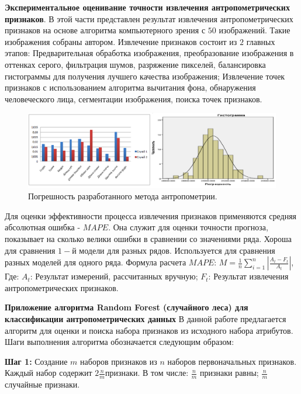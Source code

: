 \textbf{Экспериментальное оценивание точности извлечения антропометрических признаков}. В этой части представлен результат извлечения антропометрических признаков на основе алгоритма компьютерного зрения с $50$ изображений. Такие изображения собраны автором. Извлечение признаков состоит из $2$ главных этапов: Предварительная обработка изображения, преобразование изображения в оттенках серого, фильтрация шумов, разряжение пикселей, балансировка гистограммы для получения лучшего качества изображения; Извлечение точек признаков с использованием алгоритма вычитания фона, обнаружения человеческого лица, сегментации изображения, поиска точек признаков. 
\begin{figure}
\centering
\includegraphics [scale=0.3] {images/h16.png}
\begin{center}
\caption{Погрешность разработанного метода антропометрии.} \label{img16}
\end{center}
\end{figure}
Для оценки эффективности процесса извлечения признаков применяются средняя абсолютная ошибка - $MAPE$. Она служит для оценки точности прогноза, показывает на сколько велики ошибки в сравнении со значениями ряда. Хороша для сравнения $1-й$ модели для разных рядов. Используется для сравнения разных моделей для одного ряда. Формула расчета $MAPE$: $M=\frac{1}{n}\sum^n_{i=1}\left|\frac{A_t-F_t}{A_t}\right|$, Где: $A_t$: Результат измерений, рассчитанных вручную; $F_t$: Результат извлечения антропометрических признаков.

\textbf {Приложение алгоритма Random Forest (случайного леса) для классификации антропометрических данных}
В данной работе предлагается алгоритм для оценки и поиска набора признаков из исходного набора атрибутов. Шаги выполнения алгоритма обозначается следующим образом:

\textbf{Шаг 1:} Создание $m$ наборов признаков из $n$ наборов первоначальных признаков. Каждый набор содержит $2 \frac{n}{m} $признаки. В том числе: $\frac{n}{m}$ признаки равны; $\frac{n}{m}$ случайные признаки.


